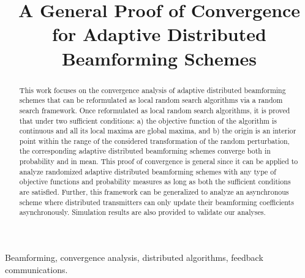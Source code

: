 \documentclass{article}
\title{A General Proof of Convergence for Adaptive Distributed Beamforming Schemes}
\begin{document}
\ninept
\maketitle

\begin{abstract}
\vspace{-0.10cm}
This work focuses on the convergence analysis of adaptive distributed beamforming schemes that can be reformulated as local random search algorithms via a random search framework. Once reformulated as local random search algorithms, it is proved that under two sufficient conditions: a) the objective function of the algorithm is continuous and all its local maxima are global maxima, and b) the origin is an interior point within the range of the considered transformation of the random perturbation, the corresponding adaptive distributed beamforming schemes converge both in probability and in mean. This proof of convergence is general since it can be applied to analyze randomized adaptive distributed beamforming schemes with any type of objective functions and probability measures as long as both the sufficient conditions are satisfied. Further, this framework can be generalized to analyze an asynchronous scheme where distributed transmitters can only update their beamforming coefficients asynchronously. Simulation results are also provided to validate our analyses.
\end{abstract}

\begin{keywords}
Beamforming, convergence analysis, distributed algorithms, feedback communications.
\end{keywords}

\vspace{-0.10cm}
\end{document}
